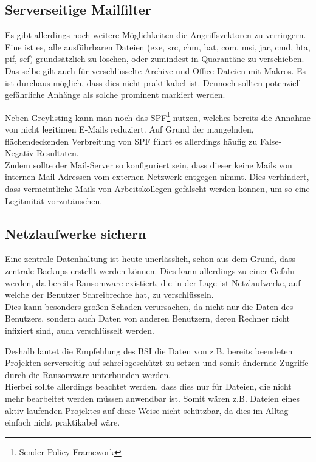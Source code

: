 \subsection{Serverseitige Mailfilter}

Es gibt allerdings noch weitere Möglichkeiten die Angriffsvektoren zu verringern. Eine ist es, alle ausführbaren Dateien (exe, src, chm, bat, com, msi, jar, cmd, hta, pif, scf) grundsätzlich zu löschen, oder zumindest in Quarantäne zu verschieben. \cite{bsi:ransome} \\
Das selbe gilt auch für verschlüsselte Archive und Office-Dateien mit Makros. Es ist durchaus möglich, dass dies nicht praktikabel ist. Dennoch sollten potenziell gefährliche Anhänge als solche prominent markiert werden. \cite{bsi:ransome}

Neben Greylisting kann man noch das SPF\footnote{Sender-Policy-Framework} nutzen, welches bereits die Annahme von nicht legitimen E-Mails reduziert. Auf Grund der mangelnden, flächendeckenden Verbreitung von SPF führt es allerdings häufig zu False-Negativ-Resultaten.\\
Zudem sollte der Mail-Server so konfiguriert sein, dass dieser keine Mails von internen Mail-Adressen vom externen Netzwerk entgegen nimmt. Dies verhindert, dass vermeintliche Mails von Arbeitskollegen gefälscht werden können, um so eine Legitmität vorzutäuschen.
	
\subsection{Netzlaufwerke sichern}

Eine zentrale Datenhaltung ist heute unerlässlich, schon aus dem Grund, dass zentrale Backups erstellt werden können. Dies kann allerdings zu einer Gefahr werden, da bereits Ransomware existiert, die in der Lage ist Netzlaufwerke, auf welche der Benutzer Schreibrechte hat, zu verschlüsseln. \\
Dies kann besonders großen Schaden verursachen, da nicht nur die Daten des Benutzers, sondern auch Daten von anderen Benutzern, deren Rechner nicht infiziert sind, auch verschlüsselt werden. 

Deshalb lautet die Empfehlung des BSI die Daten von z.B. bereits beendeten Projekten serverseitig auf schreibgeschützt zu setzen und somit ändernde Zugriffe durch die Ransomware unterbunden werden. \cite{bsi:ransome} \\
Hierbei sollte allerdings beachtet werden, dass dies nur für Dateien, die nicht mehr bearbeitet werden müssen anwendbar ist. Somit wären z.B. Dateien eines aktiv laufenden Projektes auf diese Weise nicht schützbar, da dies im Alltag einfach nicht praktikabel wäre.
	
